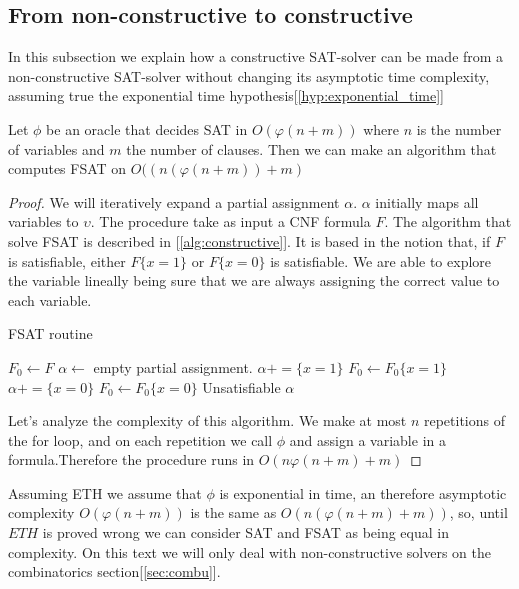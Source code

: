   
  \subsection{From non-constructive to constructive}
  \label{sub:fromnon}
  In this subsection we explain how a constructive SAT-solver can be made from a non-constructive SAT-solver without changing its asymptotic time complexity, assuming true the exponential time hypothesis[\ref{hyp:exponential_time}]

  \begin{proposition}
    Let $\phi$ be an oracle that decides SAT in $O(\varphi(n+m))$ where $n$ is the number of variables and $m$ the number of clauses. Then we can make an algorithm  that computes FSAT on $O((n(\varphi(n+m))+m)$ 
  \end{proposition}
  \begin{proof}
    We will iteratively expand a partial assignment $\alpha$. $\alpha$ initially maps all variables to $\upsilon$. The procedure take as input a CNF formula $F$. The algorithm that solve FSAT is described in [\ref{alg:constructive}]. It is based in the notion that, if  $F$ is satisfiable, either $F\{x=1\}$ or $F\{x=0\}$ is satisfiable. We are able to explore the variable lineally being sure that we are always assigning the correct value to each variable. 

    
    \begin{algorithm}
  \caption{FSAT routine}\label{alg:constructive}
  \begin{algorithmic}[1]

    
  \State $F_0 \gets F$
  \State $\alpha \gets$ empty partial assignment.
  \State
    \State $\alpha += \{x = 1\}$
    \State $F_0 \gets F_0\{x=1\}$
    \Else {} 
    \State $\alpha += \{x = 0\}$
    \State $F_0 \gets F_0\{x=0\}$
    \Else
    \State \Return Unsatisfiable
    \EndIf
    \EndIf
    \EndFor
    \State \Return $\alpha$
  \end{algorithmic}
\end{algorithm}

Let's analyze the complexity of this algorithm. We make at most $n$ repetitions of the for loop, and on each repetition we call $\phi$ and assign a variable in a formula.Therefore the procedure runs in $O(n\varphi(n+m)+m)$
\end{proof}

Assuming ETH we assume that $\phi$ is exponential in time, an therefore asymptotic complexity $O(\varphi(n+m))$ is the same as $O(n(\varphi(n+m)+m))$, so, until $ETH$ is proved wrong we can consider SAT and FSAT as being equal in complexity. On this text we will only deal with non-constructive  solvers on the combinatorics section[\ref{sec:combu}].



